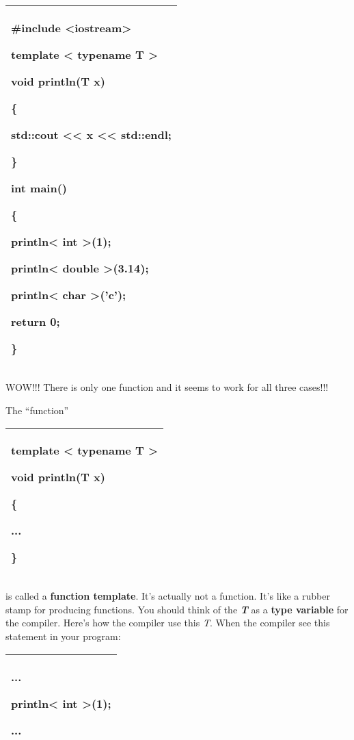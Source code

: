 \documentclass[
]{article}
\begin{document}
\begin{longtable}[]{@{}l@{}}
\toprule
\endhead
\begin{minipage}[t]{0.97\columnwidth}\raggedright
\#include \textless iostream\textgreater{}

template \textless{} typename T \textgreater{}

void println(\textbf{T} x)

\{

std::cout \textless\textless{} x \textless\textless{} std::endl;

\}

int main()

\{

println\textbf{\textless{} int \textgreater{}}(1);

println\textbf{\textless{} double \textgreater{}}(3.14);

println\textbf{\textless{} char \textgreater{}}('c');

return 0;

\}\strut
\end{minipage}\tabularnewline
\bottomrule
\end{longtable}

WOW!!! There is only one function and it seems to work for all three
cases!!!

The ``function''

\begin{longtable}[]{@{}l@{}}
\toprule
\endhead
\begin{minipage}[t]{0.97\columnwidth}\raggedright
template \textless{} typename T \textgreater{}

void println(T x)

\{

...

\} \strut
\end{minipage}\tabularnewline
\bottomrule
\end{longtable}

is called a \textbf{function template}. It's actually not a function.
It's like a rubber stamp for producing functions. You should think of
the \emph{\textbf{T}} as a \textbf{type variable} for the compiler.
Here's how the compiler use this \emph{T}. When the compiler see this
statement in your program:

\begin{longtable}[]{@{}l@{}}
\toprule
\endhead
\begin{minipage}[t]{0.97\columnwidth}\raggedright
...

println\textbf{\textless{} int \textgreater{}}(1);

...\strut
\end{minipage}\tabularnewline
\bottomrule
\end{longtable}
\end{document}
